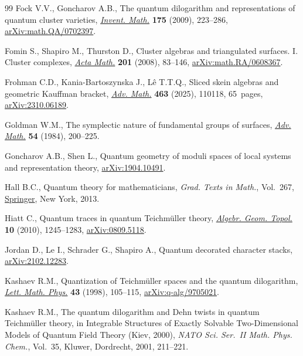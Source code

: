\begin{thebibliography}{99}
Fock V.V., Goncharov A.B., The quantum dilogarithm and representations of
 quantum cluster varieties,
 \href{https://doi.org/10.1007/s00222-008-0149-3}{\textit{Invent. Math.}}
 \textbf{175} (2009), 223--286,
 \href{http://arxiv.org/abs/math.QA/0702397}{arXiv:math.QA/0702397}.

Fomin S., Shapiro M., Thurston D., Cluster algebras and triangulated surfaces.
 {I}. {C}luster complexes,
 \href{https://doi.org/10.1007/s11511-008-0030-7}{\textit{Acta Math.}}
 \textbf{201} (2008), 83--146,
 \href{http://arxiv.org/abs/math.RA/0608367}{arXiv:math.RA/0608367}.

Frohman C.D., Kania-Bartoszynska J., L\^{e} T.T.Q., Sliced skein algebras and
 geometric {K}auffman bracket,
 \href{https://doi.org/10.1016/j.aim.2025.110118}{\textit{Adv. Math.}}
 \textbf{463} (2025), 110118, 65~pages,
 \href{http://arxiv.org/abs/2310.06189}{arXiv:2310.06189}.

Goldman W.M., The symplectic nature of fundamental groups of surfaces,
 \href{https://doi.org/10.1016/0001-8708(84)90040-9}{\textit{Adv. Math.}}
 \textbf{54} (1984), 200--225.

Goncharov A.B., Shen L., Quantum geometry of moduli spaces of local systems and
 representation theory,
 \href{http://arxiv.org/abs/1904.10491}{arXiv:1904.10491}.

Hall B.C., Quantum theory for mathematicians, \textit{Grad. Texts in Math.},
 Vol.~267, \href{https://doi.org/10.1007/978-1-4614-7116-5}{Springer}, New
 York, 2013.

Hiatt C., Quantum traces in quantum {T}eichm\"{u}ller theory,
 \href{https://doi.org/10.2140/agt.2010.10.1245}{\textit{Algebr. Geom.
 Topol.}} \textbf{10} (2010), 1245--1283,
 \href{http://arxiv.org/abs/0809.5118}{arXiv:0809.5118}.

Jordan D., Le I., Schrader G., Shapiro A., Quantum decorated character stacks,
 \href{http://arxiv.org/abs/2102.12283}{arXiv:2102.12283}.

Kashaev R.M., Quantization of {T}eichm\"{u}ller spaces and the quantum
 dilogarithm, \href{https://doi.org/10.1023/A:1007460128279}{\textit{Lett.
 Math. Phys.}} \textbf{43} (1998), 105--115,
 \href{http://arxiv.org/abs/q-alg/9705021}{arXiv:q-alg/9705021}.

Kashaev R.M., The quantum dilogarithm and {D}ehn twists in quantum
 {T}eichm\"{u}ller theory, in Integrable Structures of Exactly Solvable
 Two-Dimensional Models of Quantum Field Theory ({K}iev, 2000), \textit{NATO
 Sci. Ser.~II Math. Phys. Chem.}, Vol.~35, Kluwer, Dordrecht, 2001, 211--221.


\end{thebibliography}
